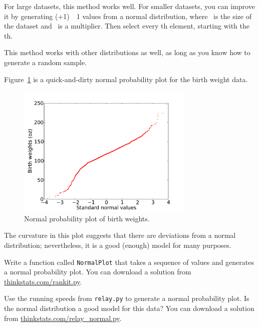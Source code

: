 \documentclass[12pt]{book}
\begin{document}
For large datasets, this method works well.
For smaller datasets, you can improve it by generating \m (\n+1)~\minus~1
values from a normal distribution, where \n~is the size of the
dataset and \m~is a multiplier.  Then select every \m th element,
starting with the \m th.  


This method works with other distributions as well, as long as
you know how to generate a random sample.

Figure~\ref{nsfg_birthwgt_normal} is a quick-and-dirty normal
probability plot for the birth weight data.

\begin{figure}
\centerline{\includegraphics[height=2.5in]{figs/nsfg_birthwgt_normal.pdf}}
\caption{Normal probability plot of birth weights.}
\label{nsfg_birthwgt_normal}
\end{figure}

The curvature in this plot suggests that there are
deviations from a normal distribution; nevertheless, it is a
good (enough) model for many purposes.

\begin{exercise}
Write a function called {\tt NormalPlot} that takes a sequence of
values and generates a normal probability plot.  You can download
a solution from \url{thinkstats.com/rankit.py}.

Use the running speeds from {\tt relay.py} to generate a normal
probability plot.  Is the normal distribution a good model for this
data?  You can download a solution from
\url{thinkstats.com/relay_normal.py}.

\end{exercise}
\end{document}

